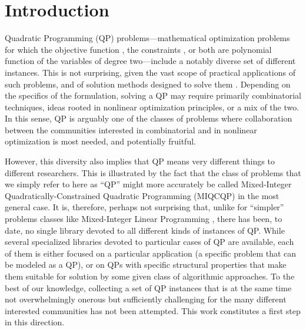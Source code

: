 
\section{Introduction}\label{sec:intro}

Quadratic Programming (QP) problems---mathematical optimization problems for which the objective function \cite{wiki:qp}, the constraints \cite{wiki:qcqp}, or both are polynomial function of the variables of degree two---include a notably diverse set of different instances. This is not surprising, given the vast scope of practical applications of such problems, and of solution methods designed to solve them \cite{GoulToin00a}. Depending on the specifics of the formulation, solving a QP may require primarily combinatorial techniques, ideas rooted in nonlinear optimization principles, or a mix of the two. In this sense, QP is arguably one of the classes of problems where collaboration between the communities interested in combinatorial and in nonlinear optimization is most needed, and potentially fruitful.

However, this diversity also implies that QP means very different things to different researchers. This is illustrated by the fact that the class of problems that we simply refer to here as ``QP'' might more accurately be called Mixed-Integer Quadratically-Constrained Quadratic Programming (MIQCQP) in the most general case. It is, therefore, perhaps not surprising that, unlike for ``simpler'' problems classes like Mixed-Integer Linear Programming \cite{Koch2011},  there has been, to date, no single library devoted to all different kinds of instances of QP. While several specialized libraries devoted to particular cases of QP are available, each of them is either focused on a particular application (a specific problem that can be modeled as a QP), or on QPs with specific structural properties that make them suitable for solution by some given class of algorithmic approaches. To the best of our knowledge, collecting a set of QP instances that is at the same time not overwhelmingly onerous but sufficiently challenging for the many different interested communities has not been attempted. This work constitutes a first step in this direction.

